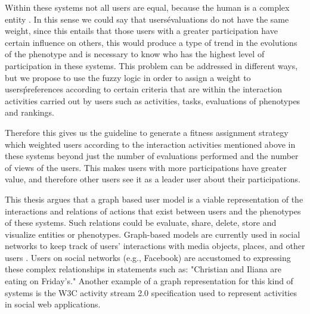 \par Within these systems not all users are equal, because the human is a complex
entity \cite{mitchell2009complexity}. In this sense we could say that users\'
evaluations do not have the same weight, since this entails
that those users with a greater participation have certain influence on others,
this would produce a
type of trend in the evolutions of the phenotype and is necessary to know who
has the highest level of participation in these systems. This problem can be
addressed in different ways, but we propose to use the fuzzy logic
\cite{Zadeh1973}\cite{TakagiSugeno1983}\cite{ohsaki1998input} in order to assign
a weight to users\' preferences according to certain criteria that are within the
interaction activities carried out by users such as activities, tasks,
evaluations of phenotypes and rankings.

\par Therefore this gives us the guideline to generate a fitness assignment
strategy which weighted users according to the interaction activities mentioned
above in these systems beyond just the number of evaluations performed and the
number of views of the users. This makes users with more participations have
greater value, and therefore other users see it as a leader user about their
participations.

\par This thesis argues that a graph based user model is a viable representation of
the interactions and relations of actions that exist between users
and the phenotypes of these systems. Such relations could be evaluate, share, delete,
store and visualize entities or phenotypes. Graph-based models are currently
used in social networks to
keep track of users' interactions with media objects, places, and other users
\cite{bondy1976graph, miller2013graph, holzschuher2013performance}. Users on
social networks (e.g., Facebook) are accustomed to expressing these
complex relationships in statements such as: "Christian and Iliana are eating on
Friday's." Another example of a graph representation for this kind
of systems is the W3C activity stream 2.0 specification used to
represent activities in social web applications.

